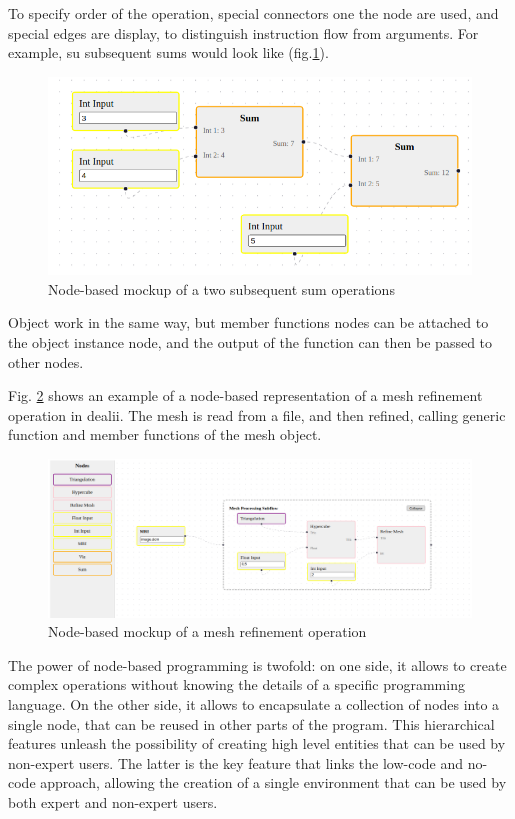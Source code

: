 \documentclass[a4paper,12pt]{article}
\begin{document}
To specify order of the operation, special connectors one the node are used, and special edges are display, to distinguish instruction flow from arguments. For example, su subsequent sums would look like (fig.\ref{twosum}).

\begin{figure}
    \label{twosum}
    \includegraphics[width=400pt]{twosum.png}
    \caption{Node-based mockup of a two subsequent sum operations}
\end{figure}
    

Object work in the same way, but member functions nodes can be attached to the object instance node, and the output of the function can then be passed to other nodes.

Fig. \ref{refine} shows an example of a node-based representation of a mesh refinement operation in dealii. The mesh is read from a file, and then refined, calling generic function and member functions of the mesh object.
\begin{figure}
    \label{refine}
    \includegraphics[width=400pt]{refine.png}
    \caption{Node-based mockup of a mesh refinement operation}
\end{figure}


The power of node-based programming is twofold: on one side, it allows to create complex operations without knowing the details of a specific programming language. On the other side, it allows to encapsulate a collection of nodes into a single node, that can be reused in other parts of the program. This hierarchical features unleash the possibility of creating high level entities that can be used by non-expert users. The latter is the key feature that links the low-code and no-code approach, allowing the creation of a single environment that can be used by both expert and non-expert users.
\end{document}
